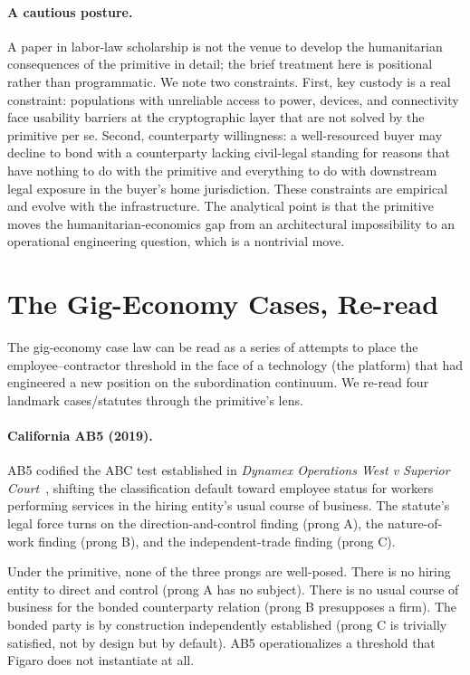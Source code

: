 \documentclass[11pt,a4paper]{article}
\theoremstyle{remark}
\begin{document}
\paragraph{A cautious posture.}
A paper in labor-law scholarship is not the venue to develop the
humanitarian consequences of the primitive in detail; the brief
treatment here is positional rather than programmatic. We note two
constraints. First, key custody is a real constraint: populations
with unreliable access to power, devices, and connectivity face
usability barriers at the cryptographic layer that are not solved
by the primitive per se. Second, counterparty willingness: a
well-resourced buyer may decline to bond with a counterparty
lacking civil-legal standing for reasons that have nothing to do
with the primitive and everything to do with downstream legal
exposure in the buyer's home jurisdiction. These constraints are
empirical and evolve with the infrastructure. The analytical
point is that the primitive moves the humanitarian-economics gap
from an architectural impossibility to an operational engineering
question, which is a nontrivial move.

\section{The Gig-Economy Cases, Re-read}
\label{sec:gig}

The gig-economy case law can be read as a series of attempts to
place the employee--contractor threshold in the face of a
technology (the platform) that had engineered a new position on the
subordination continuum. We re-read four landmark cases/statutes
through the primitive's lens.

\paragraph{California AB5 (2019).}
AB5 codified the ABC test established in \emph{Dynamex Operations
West v Superior Court}~\citep{dynamex_2018}, shifting the
classification default toward employee status for workers
performing services in the hiring entity's usual course of
business. The statute's legal force turns on the direction-and-control
finding (prong A), the nature-of-work finding (prong B), and the
independent-trade finding (prong C).

Under the primitive, none of the three prongs are well-posed. There
is no hiring entity to direct and control (prong A has no subject).
There is no usual course of business for the bonded counterparty
relation (prong B presupposes a firm). The bonded party is by
construction independently established (prong C is trivially
satisfied, not by design but by default). AB5 operationalizes a
threshold that Figaro does not instantiate at all.
\end{document}

